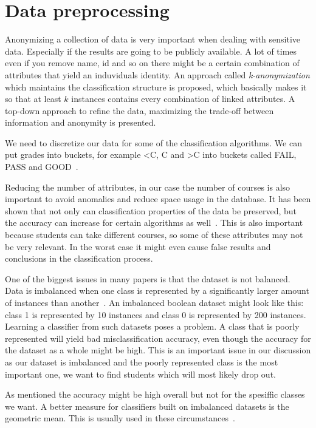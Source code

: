 \section{Data preprocessing}
Anonymizing a collection of data is very important when dealing with sensitive data. 
Especially if the results are going to be publicly available. 
A lot of times even if you remove name, id and so on there might be a certain combination of attributes that yield an induviduals identity.
An approach called \textit{k-anonymization} which maintains the classification structure is proposed, 
which basically makes it so that at least $k$ instances contains every combination of linked attributes. 
A top-down approach to refine the data, maximizing the trade-off between information and anonymity is presented.~\cite{14}

\bigskip\noindent
We need to discretize our data for some of the classification algorithms.
We can put grades into buckets, for example \textless C, C and \textgreater C into buckets called FAIL, PASS and GOOD~\cite{12}.

\bigskip\noindent
Reducing the number of attributes, in our case the number of courses is also important to avoid anomalies and reduce space usage in the database.
It has been shown that not only can classification properties of the data be preserved, but the accuracy can increase for certain algorithms as well~\cite{9}.
This is also important because students can take different courses, so some of these attributes may not be very relevant. 
In the worst case it might even cause false results and conclusions in the classification process.

\bigskip\noindent
One of the biggest issues in many papers is that the dataset is not balanced. 
Data is imbalanced when one class is represented by a significantly larger amount of instances than another~\cite{10}. 
An imbalanced boolean dataset might look like this: class 1 is represented by 10 instances and class 0 is represented by 200 instances. 
Learning a classifier from such datasets poses a problem. 
A class that is poorly represented will yield bad misclassification accuracy, 
even though the accuracy for the dataset as a whole might be high. 
This is an important issue in our discussion as our dataset is imbalanced and the poorly represented class is the most important one, 
we want to find students which will most likely drop out.

\bigskip\noindent
As mentioned the accuracy might be high overall but not for the spesiffic classes we want.
A better measure for classifiers built on imbalanced datasets is the geometric mean. 
This is usually used in these circumstances~\cite{12}. 

